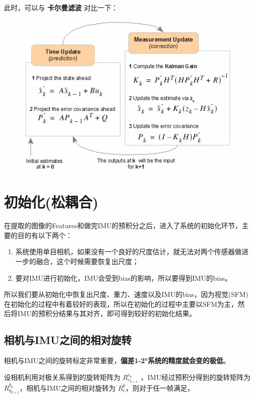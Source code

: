 \documentclass[12pt,a4paper]{article}
\begin{document}
此时，可以与 \textbf{卡尔曼滤波} 对比一下：

\begin{figure}[htbp]
\centering
\includegraphics[scale=0.6]{images/kf_flow.jpg}
\end{figure}


\section{初始化(松耦合)}

在提取的图像的Features和做完IMU的预积分之后，进入了系统的初始化环节，主要的目的有以下两个：      

\begin{enumerate}
\item 系统使用单目相机，如果没有一个良好的尺度估计，就无法对两个传感器做进一步的融合，这个时候需要恢复出尺度；
\item 要对IMU进行初始化，IMU会受到bias的影响，所以要得到IMU的bias。
\end{enumerate}

所以我们要从初始化中恢复出尺度、重力、速度以及IMU的bias，因为视觉(SFM)在初始化的过程中有着较好的表现，所以在初始化的过程中主要以SFM为主，然后将IMU的预积分结果与其对齐，即可得到较好的初始化结果。

\subsection{相机与IMU之间的相对旋转}

相机与IMU之间的旋转标定非常重要，\textbf{偏差1-2°系统的精度就会变的极低}\cite{xiaobuyi2018webnote}。

设相机利用对极关系得到的旋转矩阵为 $R_{c_{k+1}}^{c_k}$ ，IMU经过预积分得到的旋转矩阵为 $R_{b_{k+1}}^{b_{k}}$，相机与IMU之间的相对旋转为 $R_{c}^{b}$，则对于任一帧满足，
\end{document}
